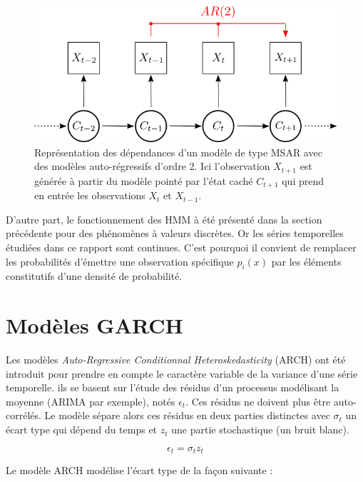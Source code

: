 \documentclass[12pt]{report}
\begin{document}
\begin{figure}[ht]
	\begin{center}
		\includegraphics[width=\textwidth]{Images/Models/HMM/MSAR.png}
		\caption{Représentation des dépendances d'un modèle de type MSAR avec des modèles auto-régressifs d'ordre 2. Ici l'observation $X_{t+1}$ est générée à partir du modèle pointé par l'état caché $C_{t+1}$ qui prend en entrée les observations $X_t$ et $X_{t-1}$.}
		\label{fig::HMM:MSAR}
	\end{center}
\end{figure}


D'autre part, le fonctionnement des HMM à été présenté dans la section précédente pour des phénomènes à valeurs discrètes. Or les séries temporelles étudiées dans ce rapport sont continues. C'est pourquoi il convient de remplacer les probabilités d'émettre une observation spécifique $p_i(x)$ par les éléments constitutifs d'une densité de probabilité.


\section{Modèles GARCH}
Les modèles \textit{Auto-Regressive Conditionnal Heteroskedasticity} (ARCH) ont été introduit pour prendre en compte le caractère variable de la variance d'une série temporelle. ils se basent sur l'étude des résidus d'un processus modélisant la moyenne (ARIMA par exemple), notés $\epsilon_t$. Ces résidus ne doivent plus être auto-corrélés. Le modèle sépare alors ces résidus en deux parties distinctes avec $\sigma_t$ un écart type qui dépend du temps et $z_t$ une partie stochastique (un bruit blanc).

\begin{equation}
\epsilon_t = \sigma_t  z_t
\end{equation}

Le modèle ARCH modélise l'écart type de la façon suivante :
\end{document}
